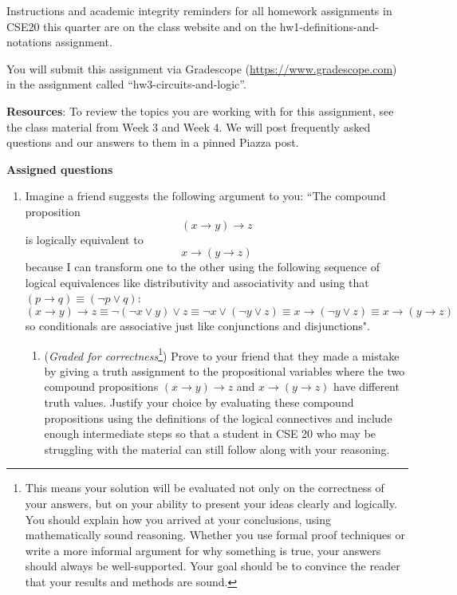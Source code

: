 \documentclass[12pt, oneside]{article}
\begin{document}
Instructions and academic integrity reminders for all homework assignments in 
CSE20 this quarter are on the class website and on the hw1-definitions-and-notations
assignment.

You will submit this assignment via Gradescope
(\href{https://www.gradescope.com}{https://www.gradescope.com}) 
in the assignment called ``hw3-circuits-and-logic''.

{\bf Resources}: To review the topics you are working with 
for this assignment, see the class material from Week 3 and Week 4.
We will post frequently asked questions and our answers to them in a 
pinned Piazza post.

{\bf Assigned questions}

\begin{enumerate}

   \item Imagine a friend suggests the following argument to you: ``The compound proposition
   \[
   (x \to y) \to z
   \]
   is logically equivalent to 
   \[
   x \to (y \to z)
   \]
   because I can transform one to the other using the following sequence of logical equivalences
   like distributivity and associativity and using that $(p \to q) \equiv (\lnot p \lor q)$: 
   \[
      (x \to y) \to z \equiv
      \lnot (\lnot x \lor y) \lor z \equiv
      \lnot x \lor (\lnot y \lor z) \equiv
      x \to (\lnot y \lor z) \equiv x \to (y \to z)
   \]
   so conditionals
   are associative just like conjunctions and disjunctions".
   
   \begin{enumerate}
   \item ({\it Graded for correctness}\footnote{This means your solution will be
   evaluated not only on the correctness of your answers, but on your ability to 
   present your ideas clearly and logically. You should explain how you arrived at your conclusions, using 
   mathematically sound reasoning. Whether you use formal proof techniques or write a more informal argument for why 
   something is true, your answers should always be well-supported. Your goal should be to convince the reader that 
   your results and methods are sound.}) Prove to your friend that they made a mistake by giving a truth
   assignment to the propositional variables where 
   the two compound propositions 
   $ (x \to y) \to z$ and $ x \to (y \to z)$ have different truth values.
   Justify your choice by evaluating these compound propositions using the definitions of the logical connectives 
   and include enough intermediate steps so that a student in CSE 20 who may be 
   struggling with the material can still follow along with your reasoning.
   

\end{enumerate}
\end{enumerate}
\end{document}

